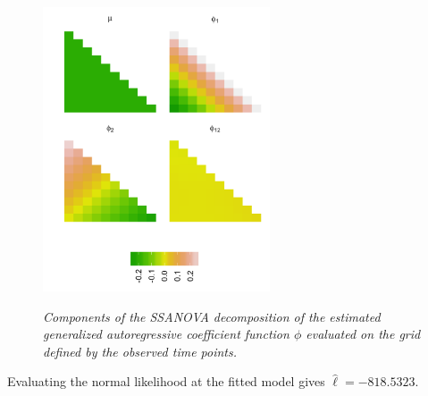 %
\begin{figure}[H] 
\centering
\caption{\textit{Components of the SSANOVA decomposition of the estimated generalized autoregressive coefficient function $\phi$ evaluated on the grid defined by the observed time points.}}
  \includegraphics[width = 0.6\textwidth]{img/chapter-5/cattle-ssanova-estimate-lattice} \label{fig:cattle-fitted-cholesky-ssanova}
\end{figure}

{}

Evaluating the normal likelihood at the fitted model gives $\hat{\ell} = -818.5323$.


%
%
%
